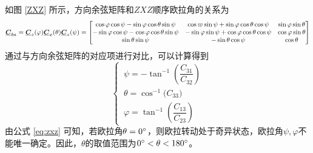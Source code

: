如图 \ref{ZXZ} 所示，方向余弦矩阵和$ZXZ$顺序欧拉角的关系为
\begin{equation}
	\underline{\bm{C}}_{ba} = \underline{\bm{C}}_z(\varphi) \underline{\bm{C}}_x(\theta) \underline{\bm{C}}_z(\psi) = 
	\begin{bmatrix}
		\cos \varphi \cos \psi - \sin \varphi \cos \theta \sin \psi & \cos \varpi \sin \psi + \sin \varphi \cos \theta \cos \psi & \sin \varphi \sin \theta \\
		- \sin \varphi \cos \psi - \cos \varphi \cos \theta \sin \psi & -\sin \varphi \sin \psi + \cos \varphi \cos \theta \cos \psi & \cos \varphi \sin \theta \\
		\sin \theta \sin \psi & -\sin \theta \cos \psi & \cos \theta 
	\end{bmatrix}
\end{equation}
通过与方向余弦矩阵的对应项进行对比，可以计算得到
\begin{equation}
	\begin{cases}
		\, \psi = -\tan^{-1}\left( \dfrac{C_{31}}{C_{32}} \right) \\
		\, \theta = \cos^{-1}\big( C_{33} \big) \\
		\, \varphi = \tan^{-1} \left( \dfrac{C_{13}}{C_{23}} \right)
	\end{cases}
	\label{eq:zxz}
\end{equation}
由公式 \eqref{eq:zxz} 可知，若欧拉角$\theta = 0{}^{\circ}$，则欧拉转动处于奇异状态，欧拉角$\psi, \varphi$不能唯一确定。因此，$\theta$的取值范围为$0{}^{\circ}<\theta<180{}^{\circ}$。
